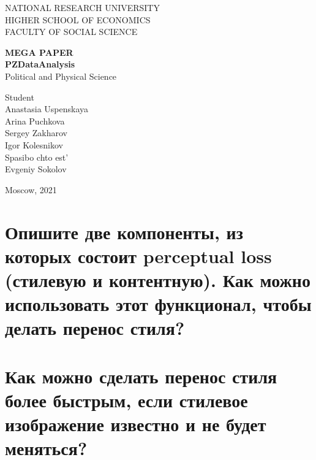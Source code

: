 \documentclass[14pt]{extarticle}
\begin{document}
	
	
	\thispagestyle{empty} 
	
	\begin{center}
		NATIONAL RESEARCH UNIVERSITY
		\\
		HIGHER SCHOOL OF ECONOMICS
		\\
		FACULTY OF SOCIAL SCIENCE
		
	\end{center}
	\vspace{12ex}
	
	\begin{center}
		\textbf{MEGA PAPER}\\
		\vspace{2ex}
		\textbf{PZDataAnalysis}\\
		\vspace{2ex}
		Political and Physical Science
	\end{center}
	
	\vspace{5ex}
	\begin{flushright}
		\hspace{40ex}
		Student\\
		Anastasia Uspenskaya \\
		Arina Puchkova \\
		Sergey Zakharov\\
		Igor Kolesnikov\\
		
		\vspace{5ex}
		Spasibo chto est'\\
		Evgeniy Sokolov \\
		
		
		
	\end{flushright}
	
	\begin{center}
		\vfill
		Moscow, 2021
	\end{center}
	
	\newpage
	
	
	\tableofcontents
	
	\newpage
	
	
	\section{Опишите две компоненты, из которых состоит perceptual loss (стилевую и контентную). Как можно использовать этот функционал, чтобы делать перенос стиля?}
	
	
	\newpage
	\section{Как можно сделать перенос стиля более быстрым, если стилевое изображение известно и не будет меняться?} %
	
	
\end{document}

